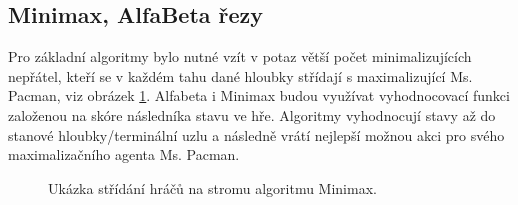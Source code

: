 \subsection*{Minimax, AlfaBeta řezy}
\label{navrh:minabmaxy}
Pro základní algoritmy bylo nutné vzít v potaz větší počet minimalizujících nepřátel, kteří se v každém tahu dané hloubky střídají s maximalizující Ms. Pacman, viz obrázek \ref{img:playersminimax}. Alfabeta i Minimax budou využívat vyhodnocovací funkci založenou na skóre následníka stavu ve hře. Algoritmy vyhodnocují stavy až do stanové hloubky/terminální uzlu a následně vrátí nejlepší možnou akci pro svého maximalizačního agenta Ms. Pacman.

\begin{figure}[!htbp]
\begin{center}
  \caption{Ukázka střídání hráčů na stromu algoritmu Minimax.}
  \label{img:playersminimax}
\end{center}
\end{figure}
\newpage
